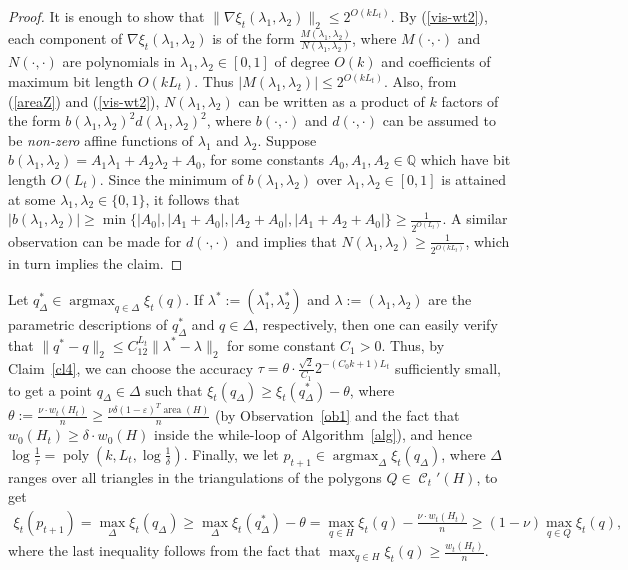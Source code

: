 \documentclass[a4paper,11pt]{article}
\def\QQ{\mathbb Q}
\def\cC{\mathcal C}
\def\eps{\varepsilon}
\newcommand{\raf}[1]{(\ref{#1})}
\newcommand{\poly}{\operatorname{poly}}
\newcommand{\argmax}{\operatorname{argmax}}
\newcommand{\area}{\operatorname{area}}
\newcommand{\cells}{\operatorname{\cC}}
\begin{document}
\begin{proof}              
	It is enough to show that $\|\nabla\xi_t(\lambda_1,\lambda_2)\|_2\le 2^{O(kL_t)}.$ By \raf{vis-wt2}, each component of $\nabla\xi_t(\lambda_1,\lambda_2)$ is of the form $\frac{M(\lambda_1,\lambda_2)}{N(\lambda_1,\lambda_2)}$, where $M(\cdot,\cdot)$ and $N(\cdot,\cdot)$ are polynomials in $\lambda_1,\lambda_2\in[0,1]$ of degree $O(k)$ and coefficients of maximum bit length $O(kL_t)$. Thus $|M(\lambda_1,\lambda_2)|\le 2^{O(kL_t)}$. Also, from \raf{areaZ} and \raf{vis-wt2}, $N(\lambda_1,\lambda_2)$ can be written as a product of $k$ factors of the form $b(\lambda_1,\lambda_2)^2d(\lambda_1,\lambda_2)^2$, where $b(\cdot,\cdot)$ and $d(\cdot,\cdot)$ can be assumed to be {\it non-zero} affine functions of $\lambda_1$ and $\lambda_2$. Suppose $b(\lambda_1,\lambda_2)=A_1\lambda_1+A_2\lambda_2+A_0$, for some constants $A_0,A_1,A_2\in\QQ$ which have bit length $O(L_t)$. Since the minimum of $b(\lambda_1,\lambda_2)$ over $\lambda_1,\lambda_2\in[0,1]$ is attained at some $\lambda_1,\lambda_2\in\{0,1\}$, it follows that $|b(\lambda_1,\lambda_2)|\ge\min\{|A_0|,|A_1+A_0|,|A_2+A_0|,|A_1+A_2+A_0|\}\ge\frac{1}{2^{O(L_t)}}$. A similar observation can be made for $d(\cdot,\cdot)$ and implies that $N(\lambda_1,\lambda_2)\ge\frac{1}{2^{O(kL_t)}}$, which in turn implies the claim.       	
\end{proof}                                             
Let $q^*_\Delta\in\argmax_{q\in\Delta}\xi_t(q)$. If $\lambda^*:=(\lambda_1^*,\lambda_2^*)$ and  $\lambda:=(\lambda_1,\lambda_2)$ are the parametric descriptions of $q^*_\Delta$ and $q\in\Delta$, respectively, then one can easily verify that $\|q^*-q\|_2\le C_12^{L_t}\|\lambda^*-\lambda\|_2$ for some constant $C_1>0$.
Thus, by Claim~\ref{cl4}, we can choose the accuracy $\tau=\theta\cdot \frac{\sqrt{2}}{C_1}2^{-(C_0k +1)L_t}$ sufficiently small, to get a point $q_\Delta\in\Delta$ such that $\xi_t(q_\Delta)\ge \xi_t(q^*_\Delta)- \theta$, where  $\theta:=\frac{\nu\cdot w_t(H_t)}{n}\ge\frac{\nu \delta (1-\eps)^T\area(H)}{n}$ (by Observation~\ref{ob1} and the fact that $w_0(H_t)\ge \delta\cdot w_0(H)$ inside the while-loop of Algorithm~\ref{alg}), and hence $\log\frac{1}{\tau}=\poly(k,L_t,\log\frac{1}{\delta})$. Finally, we let $p_{t+1}\in\argmax_{\Delta} \xi_t(q_{\Delta})$, where $\Delta$ ranges over all triangles in the triangulations of the polygons $Q\in\cells_t'(H)$, to get
\begin{align*}
\xi_t(p_{t+1})=\max_{\Delta}\xi_t(q_\Delta)\geq\max_{\Delta}\xi_t(q^*_\Delta)-\theta=\max_{q\in H}\xi_t(q)-\frac{\nu\cdot w_t(H_t)}{n}\ge(1-\nu)\max_{q\in Q}\xi_t(q),
\end{align*}                                            
where the last inequality follows from the fact that $\max_{q\in H}\xi_t(q)\ge \frac{w_t(H_t)}{n}$.
\end{document}
